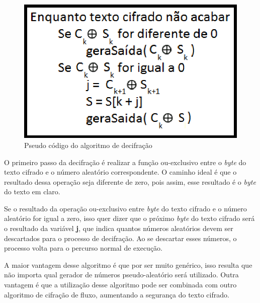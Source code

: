\begin{figure}[h]
	\centering
	\includegraphics[scale=1]{figuras/funcionamento_Decifra.eps}
	\caption{Pseudo código do algoritmo de decifração}
	\label{pseudo-codigo-decifrar}
\end{figure}

O primeiro passo da decifração é realizar a função ou-exclusivo entre o \textit{byte} do texto cifrado e o número aleatório correspondente. O caminho ideal é que o resultado dessa operação seja diferente de zero, pois assim, esse resultado é o \textit{byte} do texto em claro.

Se o resultado da operação ou-exclusivo entre \textit{byte} do texto cifrado e o número aleatório for igual a zero, isso quer dizer que o próximo \textit{byte} do texto cifrado será o resultado da variável \textbf{j}, que indica quantos números aleatórios devem ser descartados para o processo de decifração. Ao se descartar esses números, o processo volta para o percurso normal de execução. 

A maior vantagem desse algoritmo é que por ser muito genérico, isso resulta que não importa qual gerador de números pseudo-aleatório será utilizado. Outra vantagem é que a utilização desse algoritmo pode ser combinada com outro algoritmo de cifração de fluxo, aumentando a segurança do texto cifrado.
